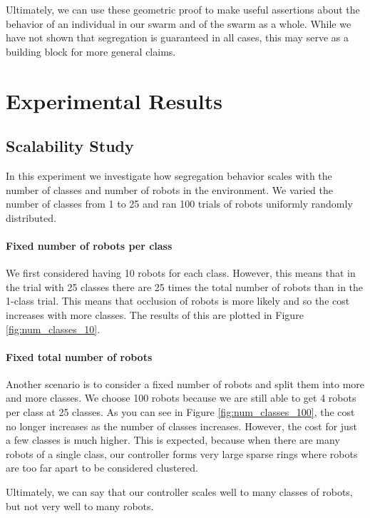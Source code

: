 \documentclass[conference]{IEEEtran}
\begin{document}
    Ultimately, we can use these geometric proof to make useful assertions about the behavior of an individual in our swarm and of the swarm as a whole. While we have not shown that segregation is guaranteed in all cases, this may serve as a building block for more general claims.

\section{Experimental Results}

  \subsection{Scalability Study} \label{section:scalability}

    In this experiment we investigate how segregation behavior scales with the number of classes and number of robots in the environment. We varied the number of classes from 1 to 25 and ran 100 trials of robots uniformly randomly distributed.

    \paragraph{Fixed number of robots per class}

    We first considered having 10 robots for each class. However, this means that in the trial with 25 classes there are 25 times the total number of robots than in the 1-class trial. This means that occlusion of robots is more likely and so the cost increases with more classes. The results of this are plotted in Figure  \ref{fig:num_classes_10}.

    \paragraph{Fixed total number of robots}

    Another scenario is to consider a fixed number of robots and split them into more and more classes. We choose 100 robots because we are still able to get 4 robots per class at 25 classes. As you can see in Figure \ref{fig:num_classes_100}, the cost no longer increases as the number of classes increases. However, the cost for just a few classes is much higher. This is expected, because when there are many robots of a single class, our controller forms very large sparse rings where robots are too far apart to be considered clustered.

    Ultimately, we can say that our controller scales well to many classes of robots, but not very well to many robots.
\end{document}
